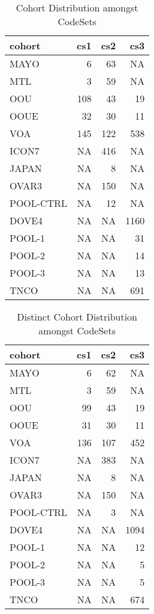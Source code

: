 \documentclass[
]{report}
\begin{document}
\begin{table}

\caption{\label{tab:cohort-dist}Cohort Distribution amongst CodeSets}
\centering
\begin{tabular}[t]{l|r|r|r}
\hline
cohort & cs1 & cs2 & cs3\\
\hline
MAYO & 6 & 63 & NA\\
\hline
MTL & 3 & 59 & NA\\
\hline
OOU & 108 & 43 & 19\\
\hline
OOUE & 32 & 30 & 11\\
\hline
VOA & 145 & 122 & 538\\
\hline
ICON7 & NA & 416 & NA\\
\hline
JAPAN & NA & 8 & NA\\
\hline
OVAR3 & NA & 150 & NA\\
\hline
POOL-CTRL & NA & 12 & NA\\
\hline
DOVE4 & NA & NA & 1160\\
\hline
POOL-1 & NA & NA & 31\\
\hline
POOL-2 & NA & NA & 14\\
\hline
POOL-3 & NA & NA & 13\\
\hline
TNCO & NA & NA & 691\\
\hline
\end{tabular}
\end{table}

\begin{table}

\caption{\label{tab:cohort-dist-distinct}Distinct Cohort Distribution amongst CodeSets}
\centering
\begin{tabular}[t]{l|r|r|r}
\hline
cohort & cs1 & cs2 & cs3\\
\hline
MAYO & 6 & 62 & NA\\
\hline
MTL & 3 & 59 & NA\\
\hline
OOU & 99 & 43 & 19\\
\hline
OOUE & 31 & 30 & 11\\
\hline
VOA & 136 & 107 & 452\\
\hline
ICON7 & NA & 383 & NA\\
\hline
JAPAN & NA & 8 & NA\\
\hline
OVAR3 & NA & 150 & NA\\
\hline
POOL-CTRL & NA & 3 & NA\\
\hline
DOVE4 & NA & NA & 1094\\
\hline
POOL-1 & NA & NA & 12\\
\hline
POOL-2 & NA & NA & 5\\
\hline
POOL-3 & NA & NA & 5\\
\hline
TNCO & NA & NA & 674\\
\hline
\end{tabular}
\end{table}
\end{document}
